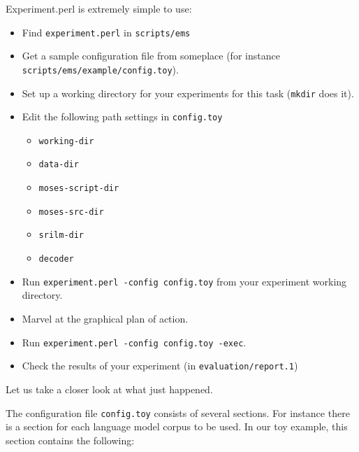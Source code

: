 Experiment.perl is extremely simple to use:

\begin{itemize}
\item Find {\tt experiment.perl} in {\tt scripts/ems}

\item Get a sample configuration file from someplace (for instance {\tt scripts/ems/example/config.toy}).

\item Set up a working directory for your experiments for this task ({\tt mkdir} does it).

\item Edit the following path settings in {\tt config.toy}
\begin{itemize}
\item {\tt working-dir}

\item {\tt data-dir}

\item {\tt moses-script-dir}

\item {\tt moses-src-dir}

\item {\tt srilm-dir}

\item {\tt decoder}

\end{itemize}

\item Run {\tt experiment.perl -config config.toy} from your experiment working directory.

\item Marvel at the graphical plan of action.

\item Run {\tt experiment.perl -config config.toy -exec}.

\item Check the results of your experiment (in {\tt evaluation/report.1})

\end{itemize}

Let us take a closer look at what just happened.



The configuration file {\tt config.toy} consists of several sections. For instance there is a section for each language model corpus to be used. In our toy example, this section contains the following:






